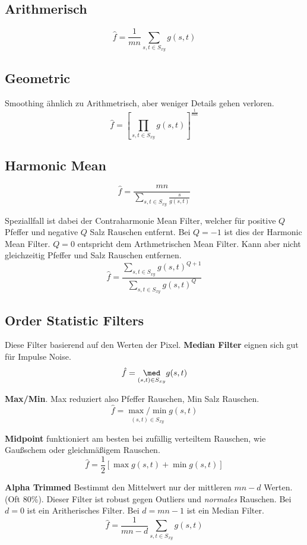 \subsection{Arithmerisch}
\[
\hat{f} = \frac{1}{mn}\sum_{s,t\in S_{xy}}g(s,t)
\]

\subsection{Geometric}
Smoothing ähnlich zu Arithmetrisch, aber weniger Details gehen verloren.
\[
\hat{f} = \left[\prod_{s,t\in S_{xy}}g(s,t)\right]^{\frac{1}{mn}}
\]

\subsection{Harmonic Mean}
\[
\hat{f} = \frac{mn}{\sum_{s,t\in S_{xy}}\frac{s}{g(s,t)}}
\]

Speziallfall ist dabei der Contraharmonie Mean Filter, welcher für positive $Q$ Pfeffer und negative $Q$ Salz Rauschen entfernt. Bei $Q=-1$ ist dies der Harmonic Mean Filter. $Q=0$ entspricht dem Arthmetrischen Mean Filter. Kann aber nicht gleichzeitig Pfeffer und Salz Rauschen entfernen.
\[
\hat{f} = \frac{\sum_{s,t\in S_{xy}}g(s,t)^{Q+1}}{\sum_{s,t\in S_{xy}}g(s,t)^Q}
\]

\subsection{Order Statistic Filters}
Diese Filter basierend auf den Werten der Pixel.
\textbf{Median Filter} eignen sich gut für Impulse Noise.
\[
\hat{f} = \underset{(s,t)\in S_{xy}}\med g(s,t)
\]

\textbf{Max/Min}. Max reduziert also Pfeffer Rauschen, Min Salz Rauschen.
\[
\hat{f} = \underset{(s,t)\in S_{xy}}{\max/\min} g(s,t)
\]

\textbf{Midpoint} funktioniert am besten bei zufällig verteiltem Rauschen, wie Gaußschem oder gleichmäßigem Rauschen.
\[
\hat{f} = \frac{1}{2}\left[\max g(s,t) + \min g(s,t)\right]
\]

\textbf{Alpha Trimmed}
Bestimmt den Mittelwert nur der mittleren $mn-d$ Werten. (Oft 80\%). Dieser Filter ist robust gegen Outliers und \textit{normales} Rauschen. Bei $d=0$ ist ein Aritherisches Filter. Bei $d = mn-1$ ist ein Median Filter.
\[
\hat{f} = \frac{1}{mn -d } \sum_{s,t\in S_{xy}}g(s,t)
\]
